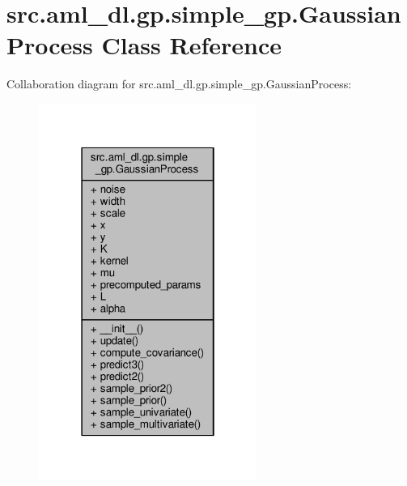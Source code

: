 \hypertarget{classsrc_1_1aml__dl_1_1gp_1_1simple__gp_1_1_gaussian_process}{\section{src.\-aml\-\_\-dl.\-gp.\-simple\-\_\-gp.\-Gaussian\-Process Class Reference}
\label{classsrc_1_1aml__dl_1_1gp_1_1simple__gp_1_1_gaussian_process}
}


Collaboration diagram for src.\-aml\-\_\-dl.\-gp.\-simple\-\_\-gp.\-Gaussian\-Process\-:\nopagebreak
\begin{figure}[H]
\begin{center}
\leavevmode
\includegraphics[width=202pt]{classsrc_1_1aml__dl_1_1gp_1_1simple__gp_1_1_gaussian_process__coll__graph}
\end{center}
\end{figure}
